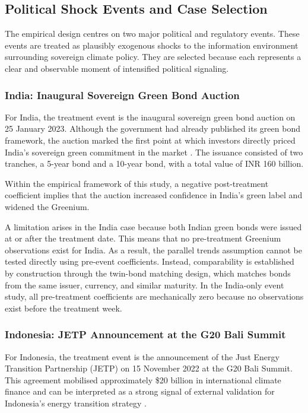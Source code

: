 \documentclass[12pt,a4paper]{article}
\begin{document}
\subsection{Political Shock Events and Case Selection}

The empirical design centres on two major political and regulatory events. These events are treated as plausibly exogenous shocks to the information environment surrounding sovereign climate policy. They are selected because each represents a clear and observable moment of intensified political signaling.

\subsubsection{India: Inaugural Sovereign Green Bond Auction}

For India, the treatment event is the inaugural sovereign green bond auction on 25 January 2023. Although the government had already published its green bond framework, the auction marked the first point at which investors directly priced India’s sovereign green commitment in the market \citep{Panizza2025}. The issuance consisted of two tranches, a 5-year bond and a 10-year bond, with a total value of INR 160 billion.

Within the empirical framework of this study, a negative post-treatment coefficient implies that the auction increased confidence in India’s green label and widened the Greenium.

A limitation arises in the India case because both Indian green bonds were issued at or after the treatment date. This means that no pre-treatment Greenium observations exist for India. As a result, the parallel trends assumption cannot be tested directly using pre-event coefficients. Instead, comparability is established by construction through the twin-bond matching design, which matches bonds from the same issuer, currency, and similar maturity. In the India-only event study, all pre-treatment coefficients are mechanically zero because no observations exist before the treatment week.

\subsubsection{Indonesia: JETP Announcement at the G20 Bali Summit}

For Indonesia, the treatment event is the announcement of the Just Energy Transition Partnership (JETP) on 15 November 2022 at the G20 Bali Summit. This agreement mobilised approximately \$20 billion in international climate finance and can be interpreted as a strong signal of external validation for Indonesia’s energy transition strategy \citep{Neumann2025}.
\end{document}
